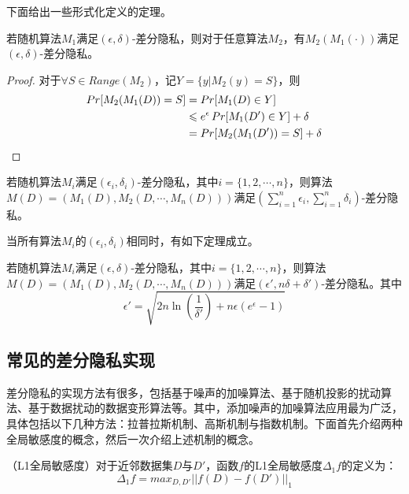 下面给出一些形式化定义的定理。

\begin{theorem}
	若随机算法$M_1$满足$(\epsilon, \delta)$-差分隐私，则对于任意算法$M_2$，有$M_2(M_1(\cdot))$满足$(\epsilon, \delta)$-差分隐私。
\end{theorem}

\begin{proof}
	对于$\forall S\in Range(M_2)$，记$Y=\{y|M_2(y)=S\}$，则
	\begin{align}
	\mathop{Pr}[M_2(M_1(D))=S]&=\mathop{Pr}[M_1(D)\in Y]\notag\\
	&\leq e^\epsilon \mathop{Pr}[M_1(D')\in Y]+\delta\notag\\
	&=\mathop{Pr}[M_2(M_1(D'))=S]+\delta\notag
	\end{align}
\end{proof}

\begin{theorem}
	若随机算法$M_i$满足$(\epsilon_i, \delta_i)$-差分隐私，其中$i=\{1,2,\cdots,n\}$，则算法$M(D)=(M_1(D),M_2(D,\cdots,M_n(D)))$满足$(\sum_{i=1}^{n}\epsilon_i, \sum_{i=1}^{n}\delta_i)$-差分隐私\cite{Algorithmic_Foundations_of_DP}。
\end{theorem}

当所有算法$M_i$的$(\epsilon_i, \delta_i)$相同时，有如下定理成立。

\begin{theorem}
	若随机算法$M_i$满足$(\epsilon, \delta)$-差分隐私，其中$i=\{1,2,\cdots,n\}$，则算法$M(D)=(M_1(D),M_2(D,\cdots,M_n(D)))$满足$(\epsilon', n\delta+\delta')$-差分隐私\cite{Algorithmic_Foundations_of_DP}。其中
		$$\epsilon'=\sqrt{2n\ln(\frac{1}{\delta'})+n\epsilon(e^\epsilon-1)}$$
\end{theorem}


\subsection{常见的差分隐私实现}

差分隐私的实现方法有很多，包括基于噪声的加噪算法、基于随机投影的扰动算法、基于数据扰动的数据变形算法等。其中，添加噪声的加噪算法应用最为广泛，具体包括以下几种方法：拉普拉斯机制\cite{LaplaceM}、高斯机制\cite{Algorithmic_Foundations_of_DP}与指数机制\cite{Mechanism_DP}。下面首先介绍两种全局敏感度的概念，然后一次介绍上述机制的概念。

\begin{definition}
	（L1全局敏感度\cite{Algorithmic_Foundations_of_DP}）对于近邻数据集$D$与$D'$，函数$f$的L1全局敏感度$\Delta_1f$的定义为：
	\begin{equation}
		\Delta_1f=max_{D,D'}||f(D)-f(D')||_1
	\end{equation}
\end{definition}

